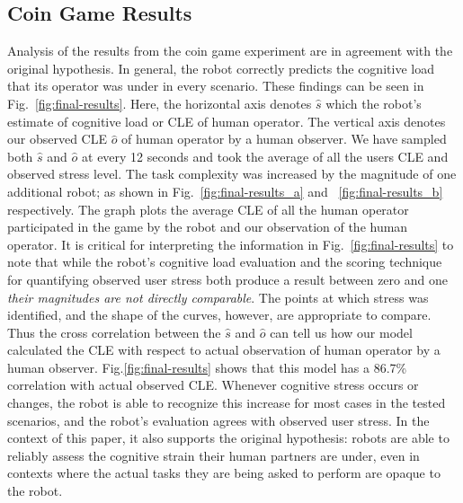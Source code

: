\documentclass{sig-alternate}
\begin{document}

\subsection{Coin Game Results}

Analysis of the results from the coin game experiment are in agreement
with the original hypothesis. In general, the robot correctly predicts
the cognitive load that its operator was under in every
scenario. These findings can be seen in Fig.~\ref{fig:final-results}.
Here, the horizontal axis denotes $\hat{s}$ which the robot's estimate of cognitive load or CLE of human operator. The vertical axis denotes our observed CLE $\hat{o}$ of human operator by a human observer. We have sampled both $\hat{s}$ and $\hat{o}$ at every 12 seconds and took the average of all the users CLE and observed stress level. The task complexity was increased by the magnitude of one additional robot; as shown in Fig.~\ref{fig:final-results_a} and ~\ref{fig:final-results_b} respectively. The graph plots the average CLE of all the human operator participated in the game by the robot and our observation of the human operator. It is critical for interpreting the
information in Fig.~\ref{fig:final-results} to note that while the robot's
cognitive load evaluation and the scoring technique for quantifying
observed user stress both produce a result between zero and one
\textit{their magnitudes are not directly comparable}. The points at
which stress was identified, and the shape of the curves, however, are
appropriate to compare. Thus the cross correlation between the $\hat{s}$ and $\hat{o}$ can tell us how our model calculated the CLE with respect to actual observation of human operator by a human observer. Fig.\ref{fig:final-results} shows that this model has a 86.7\% correlation with actual observed CLE. Whenever cognitive stress occurs or changes,
the robot is able to recognize this increase for most cases in the
tested scenarios, and the robot's evaluation agrees with observed
user stress.  In the context of this paper, it also supports the
original hypothesis: robots are able to reliably assess the
cognitive strain their human partners are under, even in contexts
where the actual tasks they are being asked to perform are opaque to
the robot.
\end{document}
